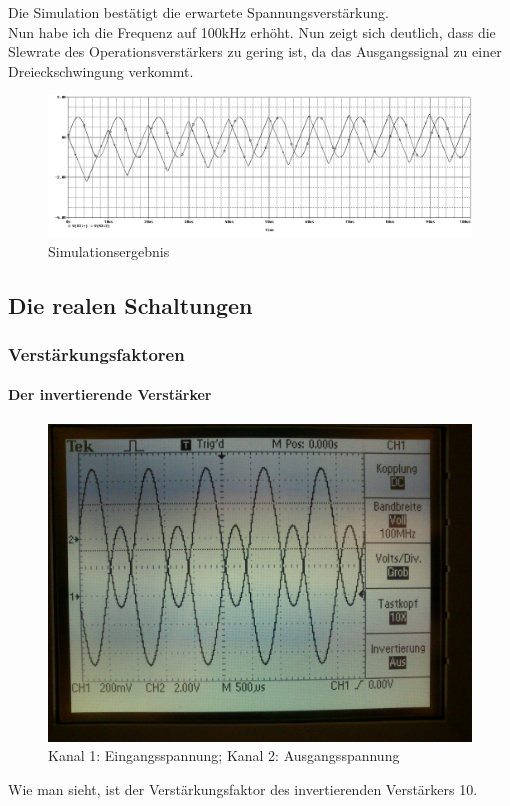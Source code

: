 Die Simulation bestätigt die erwartete Spannungsverstärkung.\\
Nun habe ich die Frequenz auf 100kHz erhöht. Nun zeigt sich deutlich, dass die Slewrate des Operationsverstärkers zu gering ist, da das Ausgangssignal zu einer Dreieckschwingung verkommt.
\begin{figure}[H]
	\centering
	\includegraphics[width=\linewidth]{versuch6/spice/632.png}
	\caption{Simulationsergebnis}
\end{figure}

\subsection{Die realen Schaltungen}
\subsubsection*{Verstärkungsfaktoren}
\paragraph{Der invertierende Verstärker}
\begin{figure}[H]
	\centering
	\includegraphics[width=\linewidth]{versuch6/oszi/DSC_0477.JPG}
	\caption{Kanal 1: Eingangsspannung; Kanal 2: Ausgangsspannung}
\end{figure}
Wie man sieht, ist der Verstärkungsfaktor des invertierenden Verstärkers 10.


